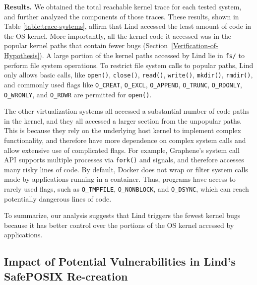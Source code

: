 {{{

\noindent
\textbf{Results.}
We obtained the total reachable kernel trace for
each tested system,
and further analyzed the components of those traces. These results,
shown in Table \ref{table:trace-systems}, affirm that Lind accessed the
least amount of code in the OS
kernel. More importantly, all the kernel code it accessed was in the
popular kernel paths that contain fewer bugs (Section~{\ref{Verification-of-Hypothesis}}).
A large portion of the kernel paths accessed by Lind lie in
\texttt{fs/} to perform file system operations.
To restrict file system calls to popular paths, Lind only allows basic calls,
like \texttt{open()}, \texttt{close()}, \texttt{read()}, \texttt{write()}, \texttt{mkdir()},
\texttt{rmdir()}, and commonly used flags like \texttt{O\_CREAT}, \texttt{O\_EXCL},
 \texttt{O\_APPEND}, \texttt{O\_TRUNC},
\texttt{O\_RDONLY}, \texttt{O\_WRONLY}, and \texttt{O\_RDWR} are
permitted for \texttt{open()}.

The other virtualization systems all accessed a substantial number of code
paths in the kernel, and they all accessed a larger section from the unpopular
paths. This is because they rely on the underlying host kernel to implement
complex functionality, and therefore have more dependence on complex system
calls and allow extensive use of complicated flags.  For example, Graphene's
system call API supports multiple processes via \texttt{fork()} and signals,
and therefore accesses many risky lines of code.  By default, Docker does not wrap
or filter system calls made by applications running in a container. Thus,
programs have access to rarely used flags, such as \texttt{O\_TMPFILE},
\texttt{O\_NONBLOCK}, and \texttt{O\_DSYNC}, which can reach potentially
dangerous lines of code.

To summarize, our analysis suggests that Lind triggers the fewest kernel bugs because
it has better control over the portions of the OS kernel accessed by applications.

\subsection{Impact of Potential Vulnerabilities in Lind's SafePOSIX Re-creation}
\label{Reachable-Kernel-Trace-Analysis-for-Repy-Sandbox}

}}}
